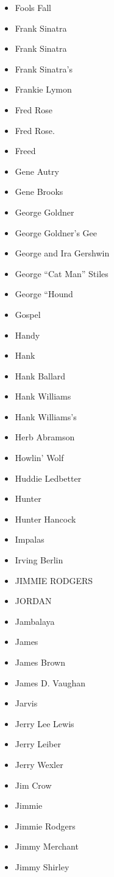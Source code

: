 \documentclass[12pt,a4paper]{article}
\begin{document}
\begin{itemize}
  \item Fools Fall
  \item Frank Sinatra
  \item Frank Sinatra
  \item Frank Sinatra's
  \item Frankie Lymon
  \item Fred Rose
  \item Fred Rose.
  \item Freed
  \item Gene Autry
  \item Gene Brooks
  \item George Goldner
  \item George Goldner's Gee
  \item George and Ira Gershwin
  \item George ``Cat Man'' Stiles
  \item George ``Hound
  \item Gospel
  \item Handy
  \item Hank
  \item Hank Ballard
  \item Hank Williams
  \item Hank Williams's
  \item Herb Abramson
  \item Howlin' Wolf
  \item Huddie Ledbetter
  \item Hunter
  \item Hunter Hancock
  \item Impalas
  \item Irving Berlin
  \item JIMMIE RODGERS
  \item JORDAN
  \item Jambalaya
  \item James
  \item James Brown
  \item James D. Vaughan
  \item Jarvis
  \item Jerry Lee Lewis
  \item Jerry Leiber
  \item Jerry Wexler
  \item Jim Crow
  \item Jimmie
  \item Jimmie Rodgers
  \item Jimmy Merchant
  \item Jimmy Shirley

\end{itemize}
\end{document}
